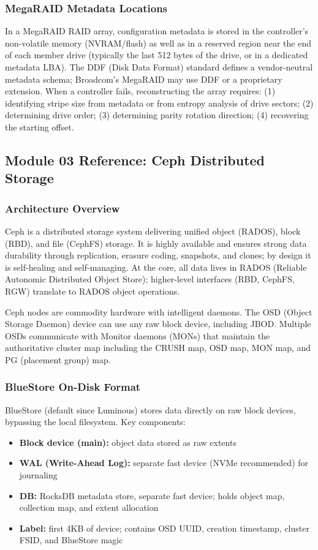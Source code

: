 \documentclass[11pt,letterpaper]{article}
\begin{document}
\subsubsection{MegaRAID Metadata Locations}

In a MegaRAID RAID array, configuration metadata is stored in the controller's non-volatile memory (NVRAM/flash) as well as in a reserved region near the end of each member drive (typically the last 512 bytes of the drive, or in a dedicated metadata LBA). The DDF (Disk Data Format) standard defines a vendor-neutral metadata schema; Broadcom's MegaRAID may use DDF or a proprietary extension. When a controller fails, reconstructing the array requires: (1) identifying stripe size from metadata or from entropy analysis of drive sectors; (2) determining drive order; (3) determining parity rotation direction; (4) recovering the starting offset.

\subsection{Module 03 Reference: Ceph Distributed Storage}

\subsubsection{Architecture Overview}

Ceph is a distributed storage system delivering unified object (RADOS), block (RBD), and file (CephFS) storage. It is highly available and ensures strong data durability through replication, erasure coding, snapshots, and clones; by design it is self-healing and self-managing. At the core, all data lives in RADOS (Reliable Autonomic Distributed Object Store); higher-level interfaces (RBD, CephFS, RGW) translate to RADOS object operations.

Ceph nodes are commodity hardware with intelligent daemons. The OSD (Object Storage Daemon) device can use any raw block device, including JBOD. Multiple OSDs communicate with Monitor daemons (MONs) that maintain the authoritative cluster map including the CRUSH map, OSD map, MON map, and PG (placement group) map.

\subsubsection{BlueStore On-Disk Format}

BlueStore (default since Luminous) stores data directly on raw block devices, bypassing the local filesystem. Key components:
\begin{itemize}[leftmargin=*]
  \item \textbf{Block device (main):} object data stored as raw extents
  \item \textbf{WAL (Write-Ahead Log):} separate fast device (NVMe recommended) for journaling
  \item \textbf{DB:} RocksDB metadata store, separate fast device; holds object map, collection map, and extent allocation
  \item \textbf{Label:} first 4KB of device; contains OSD UUID, creation timestamp, cluster FSID, and BlueStore magic
\end{itemize}
\end{document}

